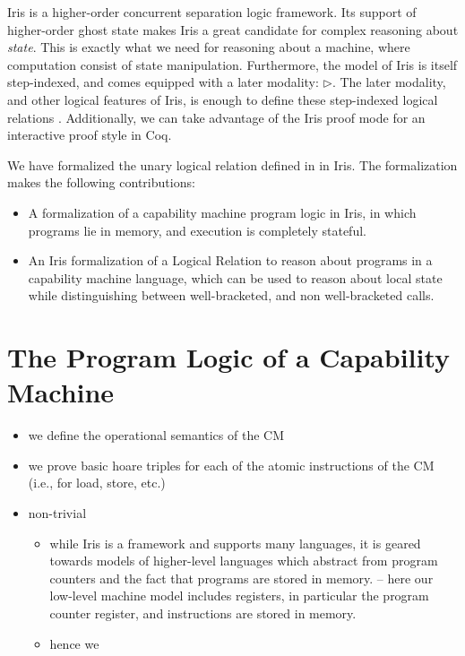 \documentclass[sigplan,review]{acmart}\settopmatter{printfolios=true,printccs=false,printacmref=false}
\begin{document}
Iris is a higher-order concurrent separation logic framework. Its support of higher-order ghost state makes Iris a great candidate for complex reasoning about \textit{state}. This is exactly what we need for reasoning about a machine, where computation consist of state manipulation. Furthermore, the model of Iris is itself step-indexed, and comes equipped with a later modality: $\triangleright$. The later modality, and other logical features of Iris, is enough to define these step-indexed logical relations\cite{Timany:2017} \cite{Jung:2017} \cite{timany2019}. Additionally, we can take advantage of the Iris proof mode \cite{Krebbers:2017} for an interactive proof style in Coq. 

We have formalized the unary logical relation defined in \cite{skorstengaardESOP18} in Iris. The formalization makes the following contributions: 
\begin{itemize}
	\item A formalization of a capability machine program logic in Iris, in which programs lie in memory, and execution is completely stateful. 
	\item An Iris formalization of a Logical Relation to reason about programs in a capability machine language, which can be used to reason about local state while distinguishing between well-bracketed, and non well-bracketed calls.
\end{itemize} 


\section{The Program Logic of a Capability Machine}

\begin{itemize}
\item we define the operational semantics of the CM
\item we prove basic hoare triples for each of the atomic instructions
  of the CM (i.e., for load, store, etc.)
\item non-trivial
  \begin{itemize}
  \item while Iris is a framework and supports many languages, it is
    geared towards models of higher-level languages which abstract from
    program counters and the fact that programs are stored in memory.
    -- here our low-level machine model includes registers, in particular
    the program counter register, and instructions are stored in memory.
   \item hence we 
  \end{itemize}
\end{itemize}
\end{document}
